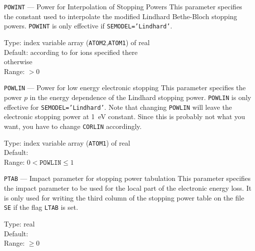 \begin{keydescription}{\texttt{POWINT} --- Power for Interpolation of 
    Stopping Powers}
%
  This parameter specifies the constant used to interpolate the
  modified Lindhard Bethe-Bloch stopping powers.  
  \texttt{POWINT} is only effective if \texttt{SEMODEL='Lindhard'}.
  \begin{keytab}
    Type:    \> index variable array (\texttt{ATOM2},\texttt{ATOM1}) 
                of real \\
    Default: \> according to \cite{I0104} for ions specified there \\
              otherwise \\
    Range:   \> $> 0$
  \end{keytab}
\end{keydescription}

\begin{keydescription}{\texttt{POWLIN} --- Power for low energy
    electronic stopping}
%
  This parameter specifies the power $p$ in the energy dependence of
  the Lindhard stopping power.  \texttt{POWLIN} is only effective for
  \texttt{SEMODEL='Lindhard'}. Note that changing \texttt{POWLIN} 
  will leave the electronic stopping power at 1~eV constant. Since this 
  is probably not what you want, you have to change \texttt{CORLIN} 
  accordingly. 
  \begin{keytab}
    Type:    \> index variable array (\texttt{ATOM1}) of real \\
    Default:  \\
    Range:   \> $0 < \texttt{POWLIN} \le 1$
  \end{keytab}
\end{keydescription}

\begin{keydescription}{\texttt{PTAB} --- Impact parameter for stopping
    power tabulation}
%
  This parameter specifies the impact parameter to be used for the local
  part of the electronic energy loss. It is only used for writing the
  third column of the stopping power table on the file \texttt{SE} if the 
  flag \texttt{LTAB} is set.
  \begin{keytab}
    Type:    \> real \\
    Default:  \\
    Range:   \> $\ge 0$
  \end{keytab}
\end{keydescription}


